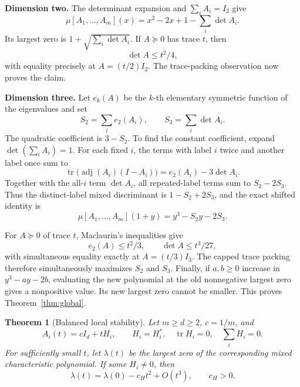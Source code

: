 \documentclass[10pt]{article}
\newtheorem{theorem}{Theorem}
\newcommand{\tr}{\operatorname{tr}}
\newcommand{\mcp}{\mu[A_1,\ldots,A_m]}
\begin{document}
\textbf{Dimension two.}
The determinant expansion and \(\sum_iA_i=I_2\) give
\[
 \mcp(x)=x^2-2x+1-\sum_i\det A_i.
\]
Its largest zero is \(1+\sqrt{\sum_i\det A_i}\).  If \(A\succeq0\) has trace
\(t\), then
\[
 \det A\leq t^2/4,
\]
with equality precisely at \(A=(t/2)I_2\).  The trace-packing observation now
proves the claim.

\textbf{Dimension three.}
Let \(e_k(A)\) be the \(k\)-th elementary symmetric function of the eigenvalues
and set
\[
 S_2=\sum_i e_2(A_i),\qquad S_3=\sum_i\det A_i.
\]
The quadratic coefficient is \(3-S_2\).  To find the constant coefficient,
expand \(\det(\sum_iA_i)=1\).  For each fixed \(i\), the terms with label \(i\)
twice and another label once sum to
\[
 \tr\!\bigl(\operatorname{adj}(A_i)(I-A_i)\bigr)
 =e_2(A_i)-3\det A_i.
\]
Together with the all-\(i\) term \(\det A_i\), all repeated-label terms sum to
\(S_2-2S_3\).  Thus the distinct-label mixed discriminant is
\(1-S_2+2S_3\), and the exact shifted identity is
\begin{equation}\label{eq:cubic}
 \mcp(1+y)=y^3-S_2y-2S_3.
\end{equation}

For \(A\succeq0\) of trace \(t\), Maclaurin's inequalities give
\[
 e_2(A)\leq t^2/3,\qquad \det A\leq t^3/27,
\]
with simultaneous equality exactly at \(A=(t/3)I_3\).  The capped trace
packing therefore simultaneously maximizes \(S_2\) and \(S_3\).  Finally, if
\(a,b\ge0\) increase in \(y^3-ay-2b\), evaluating the new polynomial at the
old nonnegative largest zero gives a nonpositive value.  Its new largest zero
cannot be smaller.  This proves Theorem~\ref{thm:global}.

\begin{theorem}[Balanced local stability]\label{thm:local}
Let \(m\ge d\ge2\), \(c=1/m\), and
\[
 A_i(t)=cI_d+tH_i,\qquad H_i=H_i^*,\quad \tr H_i=0,\quad \sum_iH_i=0.
\]
For sufficiently small \(t\), let \(\lambda(t)\) be the largest zero of the
corresponding mixed characteristic polynomial.  If some \(H_i\ne0\), then
\[
 \lambda(t)=\lambda(0)-c_Ht^2+O(t^3),\qquad c_H>0.
\]
\end{theorem}
\end{document}
